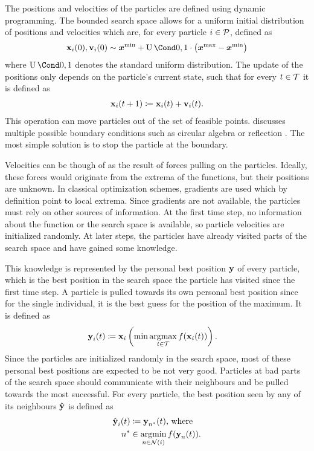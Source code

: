 The positions and velocities of the particles are defined using dynamic programming.
The bounded search space allows for a uniform initial distribution of positions and velocities which are, for every particle $i \in \operatorname{\mathcal{P}}$, defined as
\begin{align}
    \Pos_i(0), \Vel_i(0) \sim \mat{x^{\text{min}}} + \Uniform{0, 1} \cdot \left( \mat{x^{\text{max}}} - \mat{x^{\text{min}}} \right)
\end{align}
where $\Uniform{0, 1}$ denotes the standard uniform distribution.
The update of the positions only depends on the particle's current state, such that for every $t \in \mathcal{T}$ it is defined as
\begin{align}
    \operatorname{\mathbf{x}}_i(t+1) \coloneqq \operatorname{\mathbf{x}}_i(t) + \operatorname{\mathbf{v}}_i(t).
\end{align}
This operation can move particles out of the set of feasible points.
\citeauthor{engelbrecht_fundamentals_2006} discusses multiple possible boundary conditions such as circular algebra or reflection \cite{engelbrecht_fundamentals_2006}.
The most simple solution is to stop the particle at the boundary.

Velocities can be though of as the result of forces pulling on the particles.
Ideally, these forces would originate from the extrema of the functions, but their positions are unknown.
In classical optimization schemes, gradients are used which by definition point to local extrema.
Since gradients are not available, the particles must rely on other sources of information.
At the first time step, no information about the function or the search space is available, so particle velocities are initialized randomly.
At later steps, the particles have already visited parts of the search space and have gained some knowledge.

This knowledge is represented by the personal best position $\operatorname{\mathbf{y}}$ of every particle, which is the best position in the search space the particle has visited since the first time step.
A particle is pulled towards its own personal best position since for the single individual, it is the best guess for the position of the maximum.
It is defined as
\begin{align}
    \operatorname{\mathbf{y}}_i(t) &\coloneqq \operatorname{\mathbf{x}}_i \left(\min\operatorname*{argmax}_{t \in \mathcal{T}} f(\operatorname{\mathbf{x}}_i(t)) \right).
\end{align}
Since the particles are initialized randomly in the search space, most of these personal best positions are expected to be not very good.
Particles at bad parts of the search space should communicate with their neighbours and be pulled towards the most successful.
For every particle, the best position seen by any of its neighbours $\operatorname{\hat{\operatorname{\mathbf{y}}}}$ is defined as
\begin{align}
    \operatorname{\hat{\operatorname{\mathbf{y}}}}_i(t) &\coloneqq \operatorname{\mathbf{y}}_{n^\ast}(t) \text{, where} \\
    n^\ast &\in \operatorname*{argmin}_{n \in \operatorname{\mathcal{N}}(i)} f(\operatorname{\mathbf{y}}_n(t)).
\end{align}

